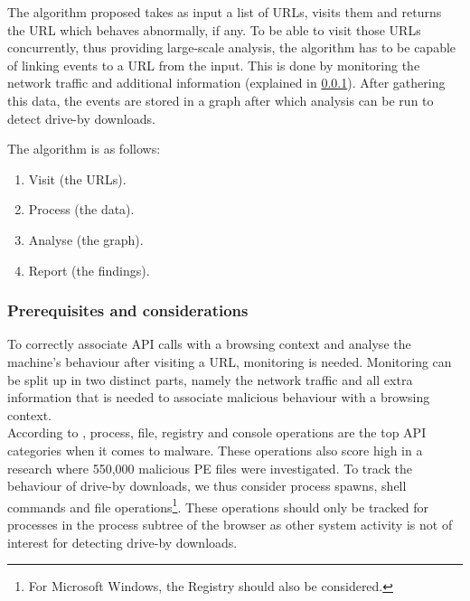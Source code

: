 The algorithm proposed takes as input a list of URLs, visits them and returns the URL which behaves abnormally, if any. To be able to visit those URLs concurrently, thus providing large-scale analysis, the algorithm has to be capable of linking events to a URL from the input. This is done by monitoring the network traffic and additional information (explained in \ref{sec:prereq}). After gathering this data, the events are stored in a graph after which analysis can be run to detect drive-by downloads.

The algorithm is as follows:

\begin{changemargin}{5cm}{0cm}
\begin{enumerate}
\item Visit (the URLs).
\item Process (the data).
\item Analyse (the graph).
\item Report (the findings).
\end{enumerate}
\end{changemargin}

\subsubsection{Prerequisites and considerations}
\label{sec:prereq}

To correctly associate API calls with a browsing context and analyse the machine's behaviour after visiting a URL, monitoring is needed. Monitoring can be split up in two distinct parts, namely the network traffic and all extra information that is needed to associate malicious behaviour with a browsing context.\\

According to \cite{Sami:2010:MDB:1774088.1774303}, process, file, registry and console operations are the top API categories when it comes to malware. These operations also score high in a research \cite{MaliciousAPIs} where 550,000 malicious PE files were investigated. To track the behaviour of drive-by downloads, we thus consider process spawns, shell commands and file operations\footnote{For Microsoft Windows, the Registry should also be considered.}. These operations should only be tracked for processes in the process subtree of the browser as other system activity is not of interest for detecting drive-by downloads.\\

